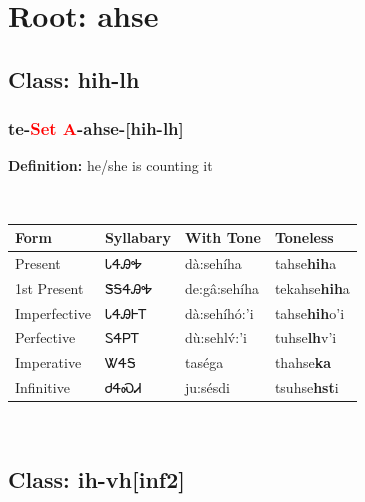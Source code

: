\needspace{4in}
\section*{Root: ahse}
\nopagebreak
{}
\needspace{3in}
\subsection*{Class: hih-lh}
\nopagebreak
\needspace{2in}
\subsubsection*{te{-}\textcolor{Red}{Set A}{-}\textbf{ahse}{-}[hih-lh]}
\nopagebreak
\textbf{Definition: } he/she is counting it
\\[0.5em]
\begin{tabularx}{\textwidth}{l X X X}%
\toprule%
\textbf{Form}&\textbf{Syllabary}&\textbf{With Tone}&\textbf{Toneless}\\%
\midrule%
Present&ᏓᏎᎯᎭ&dà:sehíha&tahse\textbf{hih}a\\%
1st Present&ᏕᎦᏎᎯᎭ&de:gâ:sehíha&tekahse\textbf{hih}a\\%
Imperfective&ᏓᏎᎯᎰᎢ&dà:sehíhó:’i&tahse\textbf{hih}o'i\\%
Perfective&ᏚᏎᏢᎢ&dù:sehlv́:’i&tuhse\textbf{lh}v'i\\%
Imperative&ᏔᏎᎦ&taséga&thahse\textbf{ka}\\%
Infinitive&ᏧᏎᏍᏗ&ju:sésdi&tsuhse\textbf{hst}i\\%
\bottomrule%
\end{tabularx}
\\[1em]
\needspace{3in}
\subsection*{Class: ih-vh[inf2]}
\nopagebreak
\needspace{2in}
